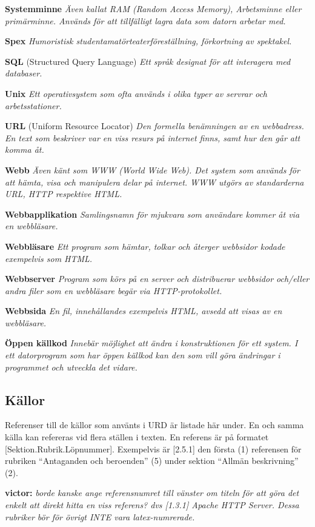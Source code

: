 \documentclass[a4paper, twoside, 11pt, titlepage]{article}
\begin{document}
	\textbf{Systemminne} \emph{Även kallat RAM (Random Access Memory), Arbetsminne eller primärminne. Används för att tillfälligt lagra data som datorn arbetar med.}

	\textbf{Spex} \emph{Humoristisk studentamatörteaterföreställning, förkortning av spektakel.}

	\textbf{SQL} (Structured Query Language) \emph{Ett språk designat för att interagera med databaser.}

	\textbf{Unix} \emph{Ett operativsystem som ofta används i olika typer av servrar och arbetsstationer.}

	\textbf{URL} (Uniform Resource Locator) \emph{Den formella benämningen av en webbadress. En text som beskriver var en viss resurs på internet finns, samt hur den går att komma åt.}

	\textbf{Webb} \emph{Även känt som WWW (World Wide Web). Det system som används för att hämta, visa och manipulera delar på internet. WWW utgörs av standarderna URL, HTTP respektive HTML.}

	\textbf{Webbapplikation} \emph{Samlingsnamn för mjukvara som användare kommer åt via en webbläsare.}

	\textbf{Webbläsare} \emph{Ett program som hämtar, tolkar och återger webbsidor kodade exempelvis som HTML.}

	\textbf{Webbserver} \emph{Program som körs på en server och distribuerar webbsidor och/eller andra filer som en webbläsare begär via HTTP-protokollet.}

	\textbf{Webbsida} \emph{En fil, innehållandes exempelvis HTML, avsedd att visas av en webbläsare.}

	\textbf{Öppen källkod} \emph{Innebär möjlighet att ändra i konstruktionen för ett system. I ett datorprogram som har öppen källkod kan den som vill göra ändringar i programmet och utveckla det vidare.}

	\subsection{Källor}


	Referenser till de källor som använts i URD är listade här under. En och samma källa kan refereras vid flera ställen i texten. En referens är på formatet [Sektion.Rubrik.Löpnummer]. Exempelvis är [2.5.1] den första (1) referensen för rubriken ``Antaganden och beroenden'' (5) under sektion ``Allmän beskrivning'' (2).

	\textbf{victor:} \emph{borde kanske ange referensnumret till vänster om titeln för att göra det enkelt att direkt hitta en viss referens? dvs [1.3.1] Apache HTTP Server. Dessa rubriker bör för övrigt INTE vara latex-numrerade.}
\end{document}
